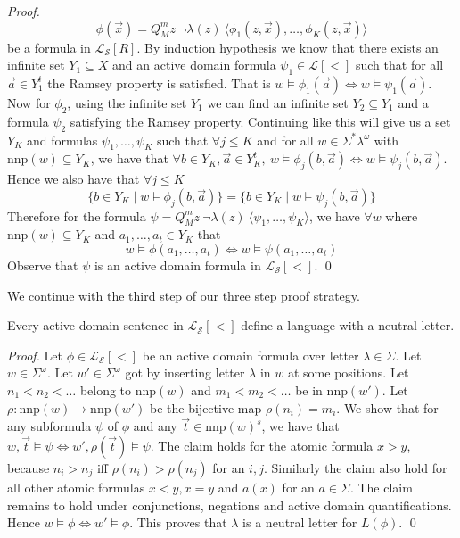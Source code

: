 \documentclass[envcountsame]{llncs}
\newcommand{\mon}[2]{Q_{#1}^{#2}}
\newcommand{\nnp}{\mathrm{nnp}}
\begin{document}
\begin{proof}
$$\phi(\vec x) = \mon{M}{m} z ~\neg \lambda(z) ~\langle \phi_1(z,\vec x),\dots,\phi_K(z,\vec x)\rangle$$
be a formula in $\mathcal{L_S}[R]$.
By induction hypothesis we know that there exists an infinite set $Y_1 \subseteq X$ and an active domain formula $\psi_1
\in \mathcal{L}[<]$ such that for all $\vec a \in Y_1^t$ the Ramsey property is satisfied. That is 
$w \models \phi_1(\vec a) \Leftrightarrow w \models \psi_1(\vec a)$. Now for $\phi_2$, using the infinite set $Y_1$ we can find an infinite 
set $Y_2 \subseteq Y_1$ and a formula $\psi_2$ satisfying the Ramsey property. Continuing like this will give us a set $Y_K$ and formulas
$\psi_1,\dots,\psi_K$ such that $\forall j\leq K$ and for all $w \in \Sigma^*\lambda^{\omega}$ with $\nnp(w) \subseteq Y_K$, we have
that $\forall b \in Y_K, \vec a \in Y_K^t,~ w \vDash \phi_j(b,\vec a) \Leftrightarrow w \vDash \psi_j(b, \vec a)$. Hence we also have 
that $\forall j \leq K$
$$\{b\in Y_K \mid w \vDash \phi_j(b,\vec a)\} = \{b\in Y_K \mid w \vDash \psi_j(b,\vec a)\}$$
Therefore for the formula $\psi = \mon{M}{m} z ~\neg \lambda(z) ~\langle \psi_1,\dots,\psi_K \rangle$, we
have $\forall w$ where $\nnp(w) \subseteq Y_K$ and $a_1,\dots,a_t \in Y_K$  that
$$w \vDash \phi(a_1,\dots,a_t) \Leftrightarrow w \vDash \psi(a_1,\dots,a_t)$$
Observe that $\psi$ is an active domain formula in $\mathcal{L_S}[<]$.
\qed \end{proof}

We continue with the third step of our three step proof strategy. 
\begin{lemma}
\label{lem_acdneutr}
 Every active domain sentence in $\mathcal{L_S}[<]$ define a language with a neutral letter.
\end{lemma}
\begin{proof}
Let $\phi \in \mathcal{L_S}[<]$ be an active domain formula over letter $\lambda \in \Sigma$. Let $w \in \Sigma^{\omega}$. 
Let $w' \in \Sigma^{\omega}$ got by inserting letter $\lambda$ in $w$ at some positions. Let $n_1 < n_2 < \dots$ belong to $\nnp(w)$ and 
$m_1< m_2 <\dots$ be in $\nnp(w')$. Let $\rho: \nnp(w) \rightarrow \nnp(w')$ be the bijective map $\rho(n_i) = m_i$. We show that for any subformula 
$\psi$ of $\phi$ and any $\vec t \in \nnp(w)^s$, we have that $w,\vec t \vDash \psi \Leftrightarrow w',\rho(\vec t) \vDash \psi$.
The claim holds for the atomic formula $x>y$, because $n_i > n_j$ iff $\rho(n_i) > \rho(n_j)$ for an $i,j$. Similarly the claim also
hold for all other atomic formulas $x<y, x=y$ and $a(x)$ for an $a \in \Sigma$. The claim remains to hold under
conjunctions, negations and active domain quantifications. Hence $w \models \phi \Leftrightarrow w' \models \phi$.
This proves that $\lambda$ is a neutral letter for $L(\phi)$.
\qed \end{proof}
\end{document}
